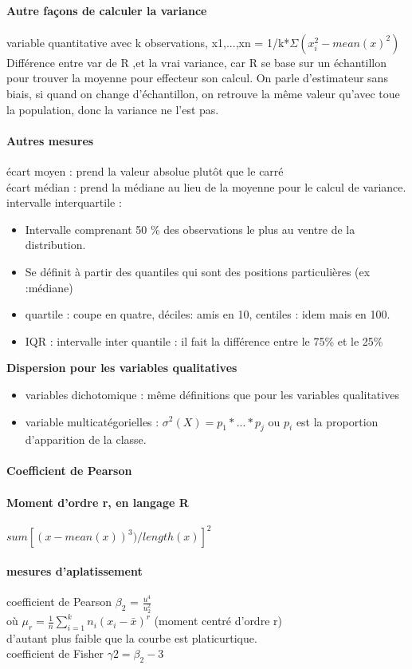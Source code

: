 \documentclass{article}
\begin{document}
\paragraph{Autre façons de calculer la variance} variable quantitative avec k observations, x1,...,xn = 1/k*$\Sigma (x_{i}^{2}-mean(x)^{2})$
Différence entre var de R ,et la vrai variance, car R se base sur un échantillon pour trouver la moyenne pour effecteur son calcul. On parle d'estimateur sans biais, si quand on change d'échantillon, on retrouve la même valeur qu'avec toue la population, donc la variance ne l'est pas.
\paragraph{Autres mesures}
écart moyen : prend la valeur absolue plutôt que le carré\\
écart médian : prend la médiane au lieu de la moyenne pour le calcul de variance.
intervalle interquartile : \begin{itemize}
\item Intervalle comprenant 50 \% des observations le plus au ventre de la distribution.
\item Se définit à partir des quantiles qui sont des positions particulières (ex :médiane)
\item quartile : coupe en quatre, déciles:  amis en 10, centiles : idem mais en 100.
\item IQR : intervalle inter quantile : il fait la différence entre le 75\% et le 25\%
\end{itemize}
\textbf{Dispersion pour les variables qualitatives}
\begin{itemize}
\item variables dichotomique : même définitions que pour les variables qualitatives
\item variable multicatégorielles : $\sigma^{2}(X) = p_{1}*...*p_{j}$ ou $p_{i}$ est la proportion d'apparition de la classe.
\end{itemize}


\paragraph{Coefficient de Pearson}
\date{13 février 2013}
\paragraph{Moment d'ordre r, en langage R} $sum[(x-mean(x))^{3})/length(x)]^2$ 
\paragraph{mesures d'aplatissement}
coefficient de Pearson $\beta_{2}$ = $\frac{u^{4}}{u_{2}^{2}}$\\ où $\mu_r = \frac{1}{n} \sum_{i=1}^k  n_i(x_i -\bar{x})^r$  (moment centré d'ordre r) \\d’autant plus faible que la courbe est platicurtique.\\coefficient de Fisher $\gamma{2}=\beta_{2}-3$
\end{document}
